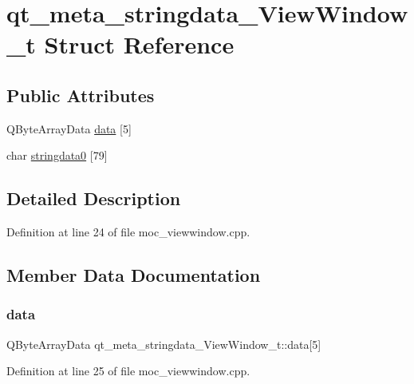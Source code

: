 \hypertarget{structqt__meta__stringdata___view_window__t}{}\section{qt\+\_\+meta\+\_\+stringdata\+\_\+\+View\+Window\+\_\+t Struct Reference}
\label{structqt__meta__stringdata___view_window__t}
\subsection*{Public Attributes}
\begin{DoxyCompactItemize}
\item 
Q\+Byte\+Array\+Data \mbox{\hyperlink{structqt__meta__stringdata___view_window__t_af4961f8c19e28a5c07a1fcc0bd1a6f0f}{data}} \mbox{[}5\mbox{]}
\item 
char \mbox{\hyperlink{structqt__meta__stringdata___view_window__t_abee99e0cd32dca0605113dfd576c567d}{stringdata0}} \mbox{[}79\mbox{]}
\end{DoxyCompactItemize}


\subsection{Detailed Description}


Definition at line 24 of file moc\+\_\+viewwindow.\+cpp.



\subsection{Member Data Documentation}
\mbox{\label{structqt__meta__stringdata___view_window__t_af4961f8c19e28a5c07a1fcc0bd1a6f0f}} 
\subsubsection{\texorpdfstring{data}{data}}
{\footnotesize\ttfamily Q\+Byte\+Array\+Data qt\+\_\+meta\+\_\+stringdata\+\_\+\+View\+Window\+\_\+t\+::data\mbox{[}5\mbox{]}}



Definition at line 25 of file moc\+\_\+viewwindow.\+cpp.

